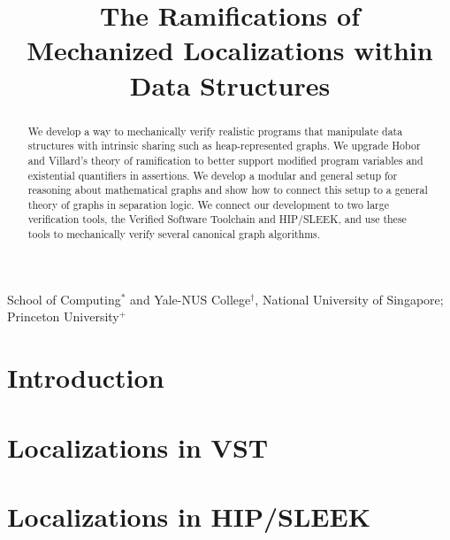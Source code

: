 \documentclass[preprint,10pt]{sigplanconf}
\begin{document}
\setlength{\pdfpageheight}{\paperheight}
\setlength{\pdfpagewidth}{\paperwidth}

%
%

\title{The Ramifications of \\ Mechanized Localizations within Data Structures}
{}
{School of Computing$^{*}$ and Yale-NUS College$^{\dagger}$, National University of Singapore; Princeton University$^{+}$}
\maketitle

\begin{abstract}
We develop a way to mechanically verify realistic programs that manipulate data structures with intrinsic sharing such as heap-represented graphs.  We upgrade Hobor and Villard's theory of ramification to better support modified program variables and existential quantifiers in assertions.  We develop a modular and general setup for reasoning about mathematical graphs and show
how to connect this setup to a general theory of graphs in separation logic.  We connect our development to two large verification tools, the Verified Software Toolchain and HIP/SLEEK, and use these tools to mechanically verify several canonical graph algorithms. %
\end{abstract}

\section{Introduction}
\label{sec:intro}



\section{Localizations in VST}
\label{sec:orientation}



\section{Localizations in HIP/SLEEK}
\label{sec:hipsleek} %
\label{sec:hipsleekmark}
\end{document}
